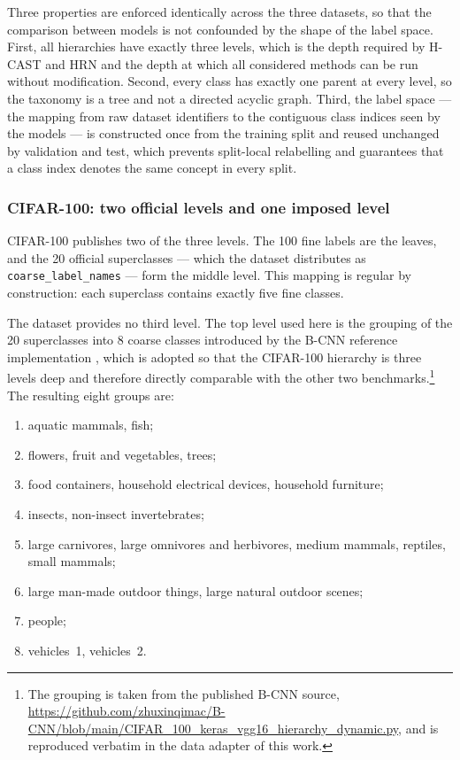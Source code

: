Three properties are enforced identically across the three datasets, so that the comparison between models is not confounded by the shape of the label space. First, all hierarchies have exactly three levels, which is the depth required by H-CAST and HRN and the depth at which all considered methods can be run without modification. Second, every class has exactly one parent at every level, so the taxonomy is a tree and not a directed acyclic graph. Third, the label space --- the mapping from raw dataset identifiers to the contiguous class indices seen by the models --- is constructed once from the training split and reused unchanged by validation and test, which prevents split-local relabelling and guarantees that a class index denotes the same concept in every split.

\subsubsection{CIFAR-100: two official levels and one imposed level}

CIFAR-100 \cite{krizhevsky2009learning} publishes two of the three levels. The 100 fine labels are the leaves, and the 20 official superclasses --- which the dataset distributes as \texttt{coarse\_label\_names} --- form the middle level. This mapping is regular by construction: each superclass contains exactly five fine classes.

The dataset provides no third level. The top level used here is the grouping of the 20 superclasses into 8 coarse classes introduced by the B-CNN reference implementation \cite{zhu2017bcnn}, which is adopted so that the CIFAR-100 hierarchy is three levels deep and therefore directly comparable with the other two benchmarks.\footnote{The grouping is taken from the published B-CNN source, \url{https://github.com/zhuxinqimac/B-CNN/blob/main/CIFAR_100_keras_vgg16_hierarchy_dynamic.py}, and is reproduced verbatim in the data adapter of this work.} The resulting eight groups are:

\begin{enumerate}[label=(\arabic*), itemsep=0pt, topsep=3pt]
  \item aquatic mammals, fish;
  \item flowers, fruit and vegetables, trees;
  \item food containers, household electrical devices, household furniture;
  \item insects, non-insect invertebrates;
  \item large carnivores, large omnivores and herbivores, medium mammals, reptiles, small mammals;
  \item large man-made outdoor things, large natural outdoor scenes;
  \item people;
  \item vehicles~1, vehicles~2.
\end{enumerate}

